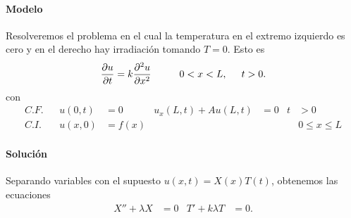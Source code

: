 \documentclass[11pt,letterpaper]{report}
\newcommand\<{\langle}
\renewcommand\>{\rangle}
\begin{document}
\paragraph{Modelo}
Resolveremos el problema en el cual la temperatura en el extremo
izquier\-do es cero y en el derecho hay irradiación tomando $T=0$.
Esto es
\[
  \frac{\partial u}{\partial t}
  = k
  \frac{\partial ^2 u}{\partial x^2}
  \hspace{10mm} 0<x<L,
  \hspace{5mm} t>0.
\]
con
\begin{align*}
  C.F. && u(0,t) &= 0 & u_x(L,t) + Au(L,t) &= 0 &t&>0 \\
  C.I. && u(x,0) &= f(x) & &&& 0\leq x\leq L
\end{align*}
\paragraph{Solución}
Separando variables con el supuesto $u(x,t)=X(x)T(t)$,
obtenemos las ecuaciones
\begin{align*}
  X''+\lambda X &= 0
  &
  T'+k\lambda T &= 0.
\end{align*}
\end{document}
